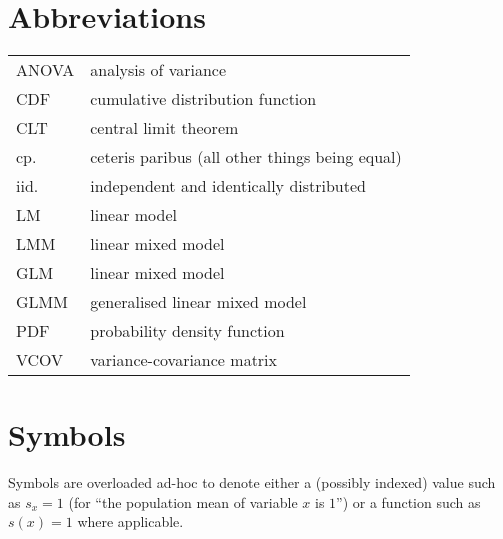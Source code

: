 
\section*{Abbreviations}

\begin{longtable}{p{}p{}}
  ANOVA & analysis of variance \\
  CDF   & cumulative distribution function \\
  CLT   & central limit theorem \\
  cp.   & ceteris paribus (all other things being equal) \\
  iid.  & independent and identically distributed \\
  LM    & linear model \\
  LMM   & linear mixed model \\
  GLM   & linear mixed model \\
  GLMM  & generalised linear mixed model \\
  PDF   & probability density function \\
  VCOV  & variance-covariance matrix \\
\end{longtable}


\section*{Symbols}

Symbols are overloaded ad-hoc to denote either a (possibly indexed) value such as $s_x=1$ (for ``the population mean of variable $x$ is $1$'') or a function such as $s(x)=1$ where applicable.

